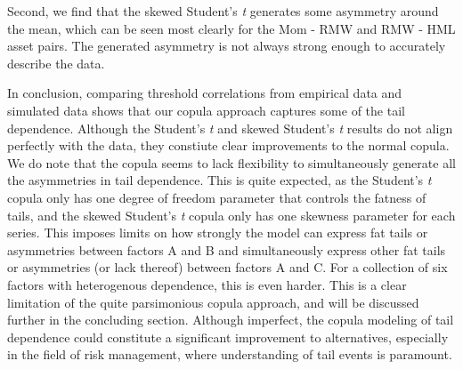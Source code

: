 Second, we find that the skewed Student's \textit{t} generates some asymmetry around the mean, which can be seen most clearly for the Mom - RMW and RMW - HML asset pairs. The generated asymmetry is not always strong enough to accurately describe the data.

In conclusion, comparing threshold correlations from empirical data and simulated data shows that our copula approach captures some of the tail dependence. Although the Student's \textit{t} and skewed Student's \textit{t} results do not align perfectly with the data, they constiute clear improvements to the normal copula. We do note that the copula seems to lack flexibility to simultaneously generate all the asymmetries in tail dependence. This is quite expected, as the Student's \textit{t} copula only has one degree of freedom parameter that controls the fatness of tails, and the skewed Student's \textit{t} copula only has one skewness parameter for each series. This imposes limits on how strongly the model can express fat tails or asymmetries between factors A and B and simultaneously express other fat tails or asymmetries (or lack thereof) between factors A and C. For a collection of six factors with heterogenous dependence, this is even harder. This is a clear limitation of the quite parsimonious copula approach, and will be discussed further in the concluding section. Although imperfect, the copula modeling of tail dependence could constitute a significant improvement to alternatives, especially in the field of risk management, where understanding of tail events is paramount.

